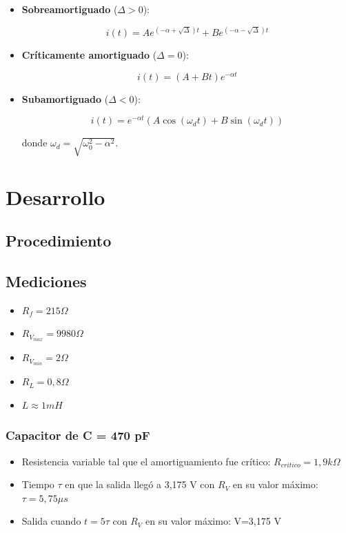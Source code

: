 \documentclass{article}
\begin{document}
\begin{itemize}
  \item \textbf{Sobreamortiguado} (\( \Delta > 0 \)):

  \begin{equation}
  i(t) = A e^{(-\alpha + \sqrt{\Delta})t} + B e^{(-\alpha - \sqrt{\Delta})t}
  \end{equation}

  \item \textbf{Críticamente amortiguado} (\( \Delta = 0 \)):

  \begin{equation}
  i(t) = (A + Bt)e^{-\alpha t}
  \end{equation}

  \item \textbf{Subamortiguado} (\( \Delta < 0 \)):

  \begin{equation}
  i(t) = e^{-\alpha t} \left( A \cos(\omega_d t) + B \sin(\omega_d t) \right)
  \end{equation}

  donde \( \omega_d = \sqrt{\omega_0^2 - \alpha^2} \).
\end{itemize}

\section{Desarrollo}
    \subsection{Procedimiento}
    \subsection{Mediciones}
 
        \begin{itemize}
            \item $ R_f = 215 \Omega $
            \item $ R_{V_{max}} = 9980 \Omega $
            \item $ R_{V_{min}} = 2 \Omega $
            \item $ R_L = 0,8 \Omega $
            \item $ L \approx 1 mH $
        \end{itemize}
        
        \par
        \subsubsection*{Capacitor de C = 470 pF}
            \begin{itemize}
                \item Resistencia variable tal que el amortiguamiento fue crítico: $ R_{critico} = 1,9 k\Omega $ %
                \item Tiempo $\tau$ en que la salida llegó a 3,175 V con $ R_V $ en su valor máximo: $ \tau = 5,75 \mu s$ %
                \item Salida cuando $t=5\tau$ con $ R_V $ en su valor máximo: V=3,175 V %
            \end{itemize}
\end{document}
